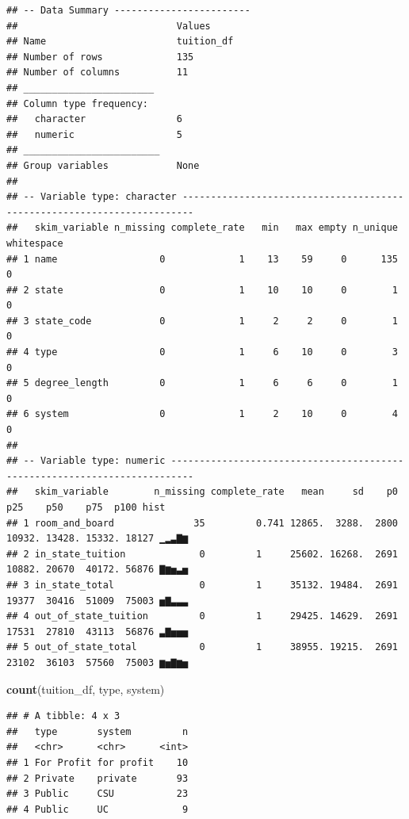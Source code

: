\documentclass[
]{article}
\newenvironment{Shaded}{\begin{snugshade}}{\end{snugshade}}
\newcommand{\KeywordTok}[1]{\textcolor[rgb]{0.13,0.29,0.53}{\textbf{#1}}}
\newcommand{\NormalTok}[1]{#1}
\begin{document}
\begin{verbatim}
## -- Data Summary ------------------------
##                            Values    
## Name                       tuition_df
## Number of rows             135       
## Number of columns          11        
## _______________________              
## Column type frequency:               
##   character                6         
##   numeric                  5         
## ________________________             
## Group variables            None      
## 
## -- Variable type: character ------------------------------------------------------------------------
##   skim_variable n_missing complete_rate   min   max empty n_unique whitespace
## 1 name                  0             1    13    59     0      135          0
## 2 state                 0             1    10    10     0        1          0
## 3 state_code            0             1     2     2     0        1          0
## 4 type                  0             1     6    10     0        3          0
## 5 degree_length         0             1     6     6     0        1          0
## 6 system                0             1     2    10     0        4          0
## 
## -- Variable type: numeric --------------------------------------------------------------------------
##   skim_variable        n_missing complete_rate   mean     sd    p0    p25    p50    p75  p100 hist 
## 1 room_and_board              35         0.741 12865.  3288.  2800 10932. 13428. 15332. 18127 ▁▂▃▇▆
## 2 in_state_tuition             0         1     25602. 16268.  2691 10882. 20670  40172. 56876 ▇▆▅▃▅
## 3 in_state_total               0         1     35132. 19484.  2691 19377  30416  51009  75003 ▅▇▃▃▃
## 4 out_of_state_tuition         0         1     29425. 14629.  2691 17531  27810  43113  56876 ▃▇▅▅▅
## 5 out_of_state_total           0         1     38955. 19215.  2691 23102  36103  57560  75003 ▆▅▇▆▅
\end{verbatim}

\begin{Shaded}
\begin{Highlighting}[]
\KeywordTok{count}\NormalTok{(tuition\_df, type, system)}
\end{Highlighting}
\end{Shaded}

\begin{verbatim}
## # A tibble: 4 x 3
##   type       system         n
##   <chr>      <chr>      <int>
## 1 For Profit for profit    10
## 2 Private    private       93
## 3 Public     CSU           23
## 4 Public     UC             9
\end{verbatim}
\end{document}
